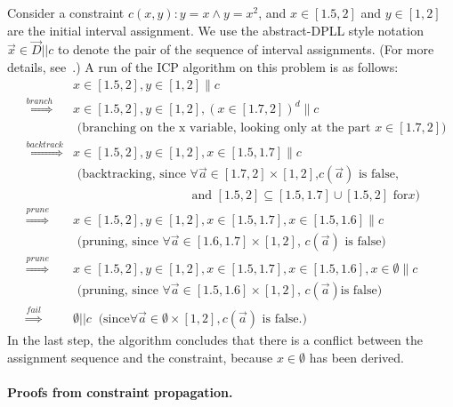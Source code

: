 \begin{example}
Consider a constraint $c(x,y) : y=x \wedge y = x^2$, and $x\in [1.5,2]$ and
$y\in [1,2]$ are the initial interval assignment. We use the abstract-DPLL style notation $\vec x\in \vec D||c$ to denote the pair of the sequence of interval assignments. (For more details, see~\cite{DBLP:conf/synasc/GaoKC13}.) A run of the ICP algorithm on this problem is as follows:
\begin{eqnarray*}
& &x\in [1.5,2], y\in [1,2]\parallel c \\
&\stackrel{branch}{\Longrightarrow}& x\in [1.5,2],
y\in [1,2], (x\in [1.7, 2])^d\parallel c\\
& &\mbox{  (branching on the x variable, looking only at the part $x\in[1.7,2]$)}\\
&\stackrel{backtrack}{\Longrightarrow}& x\in [1.5,2], y\in [1,2], x\in [1.5, 1.7]\parallel c\\
& &\mbox{  (backtracking, since $\forall\vec a\in [1.7,2]\times [1,2]$,
$c(\vec a)$ is false,}\\
& & \hspace{4cm} \mbox{and $[1.5,2]\subseteq[1.5,1.7]\cup [1.5, 2]$ for
$x$)}\\
&\stackrel{prune}{\Longrightarrow}& x\in [1.5,2], y\in [1,2], x\in [1.5, 1.7], x\in
[1.5, 1.6]\parallel c\\
& & \mbox{  (pruning, since $\forall \vec a\in[1.6,1.7]\times [1, 2]$, $c(\vec
a)$ is false)}\\
&\stackrel{prune}{\Longrightarrow}& x\in [1.5,2], y\in [1,2], x\in [1.5, 1.7],x\in [1.5, 1.6], x\in \emptyset\parallel c\\
& & \mbox{  (pruning, since $\forall \vec a\in[1.5,1.6]\times [1, 2]$, $c(\vec
a)$
is false)}\\
&\stackrel{fail}{\Longrightarrow}& \emptyset||c\ \mbox{ (since
$\forall \vec a\in \emptyset \times [1, 2], c(\vec a)$ is false.)}
\end{eqnarray*}
In the last step, the algorithm concludes that there is a conflict between the assignment sequence and the constraint, because $x\in \emptyset$ has been derived. 
\end{example}

\paragraph{Proofs from constraint propagation.}


